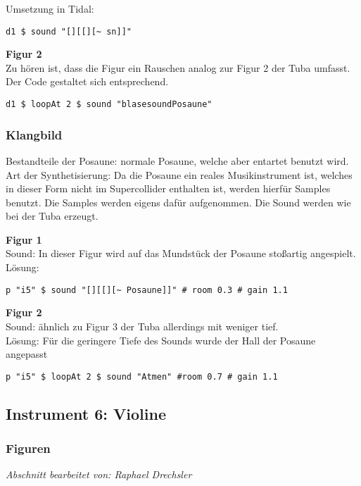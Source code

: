 \documentclass[
10pt, %
a4paper, %
oneside, %
headinclude,footinclude, %
BCOR5mm, %
]{scrartcl}
\begin{document}
\noindent Umsetzung in Tidal:
\begin{lstlisting}
d1 $ sound "[][[][~ sn]]"
\end{lstlisting}


\noindent\textbf{Figur 2}\\
Zu hören ist, dass die Figur ein Rauschen analog zur Figur 2 der Tuba umfasst. Der Code gestaltet sich entsprechend.
\begin{lstlisting}
d1 $ loopAt 2 $ sound "blasesoundPosaune"
\end{lstlisting}

\subsubsection{Klangbild}
Bestandteile der Posaune: normale Posaune, welche aber entartet benutzt wird.\\
Art der Synthetisierung: Da die Posaune ein reales Musikinstrument ist, welches in dieser Form nicht im Supercollider enthalten ist,
werden hierfür Samples benutzt. Die Samples werden eigens dafür aufgenommen. Die Sound werden wie bei der Tuba erzeugt.

\noindent\textbf{Figur 1}\\
 Sound: In dieser Figur wird auf das Mundstück der Posaune stoßartig angespielt.\\
Lösung:\\
\begin{lstlisting}
p "i5" $ sound "[][[][~ Posaune]]" # room 0.3 # gain 1.1
\end{lstlisting}

\noindent\textbf{Figur 2}\\
Sound: ähnlich zu Figur 3 der Tuba allerdings mit weniger tief.\\
Lösung: Für die geringere Tiefe des Sounds wurde der Hall der Posaune angepasst \\
\begin{lstlisting}
p "i5" $ loopAt 2 $ sound "Atmen" #room 0.7 # gain 1.1
\end{lstlisting}

\subsection{Instrument 6: Violine}
\subsubsection{Figuren}
\textit{Abschnitt bearbeitet von: Raphael Drechsler}\\
\end{document}
